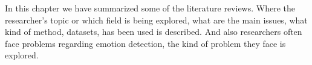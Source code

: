 In this chapter we have summarized some of the literature reviews. Where the researcher's topic or which field is being explored, what are the main issues, what kind of method, datasets, has been used is described. And also researchers often face problems regarding emotion detection, the kind of problem they face is explored.







